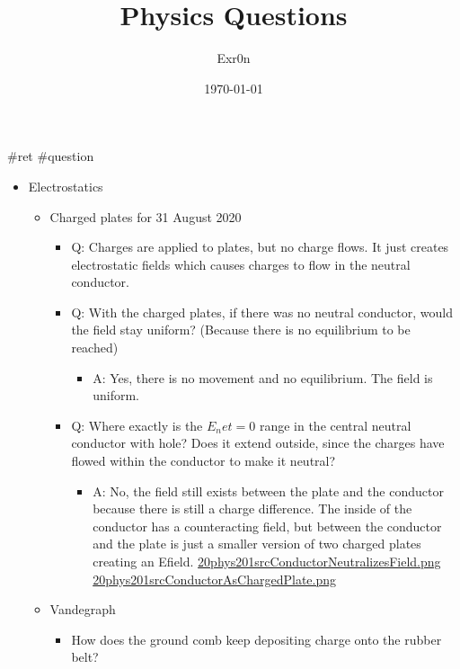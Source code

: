 \documentclass[letterpaper]{article}
\author{Exr0n}
\date{\today}
\title{Physics Questions}
\renewcommand\maketitle{}
\begin{document}
\maketitle
\#ret \#question

\begin{itemize}
\item Electrostatics

\begin{itemize}
\item Charged plates for 31 August 2020

\begin{itemize}
\item Q: Charges are applied to plates, but no charge flows. It just
creates electrostatic fields which causes charges to flow in the
neutral conductor.
\item Q: With the charged plates, if there was no neutral conductor,
would the field stay uniform? (Because there is no equilibrium to
be reached)

\begin{itemize}
\item A: Yes, there is no movement and no equilibrium. The field is
uniform.
\end{itemize}

\item Q: Where exactly is the \(E_net = 0\) range in the central neutral
conductor with hole? Does it extend outside, since the charges
have flowed within the conductor to make it neutral?

\begin{itemize}
\item A: No, the field still exists between the plate and the
conductor because there is still a charge difference. The inside
of the conductor has a counteracting field, but between the
conductor and the plate is just a smaller version of two charged
plates creating an Efield.
\href{20phys201srcConductorNeutralizesField.png.org}{20phys201srcConductorNeutralizesField.png}
\href{20phys201srcConductorAsChargedPlate.png.org}{20phys201srcConductorAsChargedPlate.png}
\end{itemize}
\end{itemize}

\item Vandegraph

\begin{itemize}
\item How does the ground comb keep depositing charge onto the rubber
belt?


\end{itemize}
\end{itemize}
\end{itemize}
\end{document}
